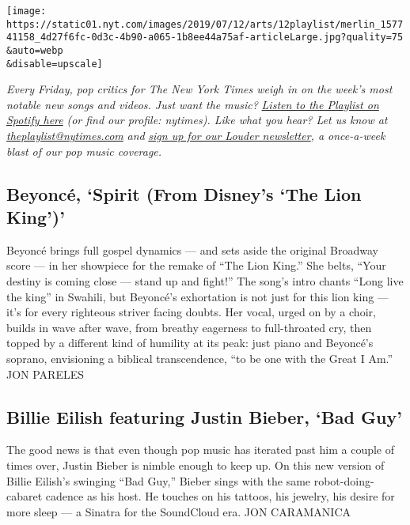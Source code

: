 \texttt{[image: https://static01.nyt.com/images/2019/07/12/arts/12playlist/merlin\_157741158\_4d27f6fc-0d3c-4b90-a065-1b8ee44a75af-articleLarge.jpg?quality=75\\\&auto=webp\\\&disable=upscale]}

\emph{Every Friday, pop critics for The New York Times weigh in on the
week's most notable new songs and videos. Just want the music?}
\href{https://open.spotify.com/playlist/35wPR33xiKIX0g8odMcWEX?si=ODVyHv3IRzapQ_5C4_eBNQ}{\emph{Listen
to the Playlist on Spotify here}} \emph{(or find our profile: nytimes).
Like what you hear? Let us know at}
\href{mailto:theplaylist@nytimes.com}{\emph{theplaylist@nytimes.com}}
\emph{and}
\href{https://www.nytimes.com/newsletters/louder?module=inline}{\emph{sign
up for our Louder newsletter}}\emph{, a once-a-week blast of our pop
music coverage.}

\hypertarget{beyoncuxe9-spirit-from-disneys-the-lion-king}{%
\subsection{Beyoncé, `Spirit (From Disney's `The Lion
King')'}\label{beyoncuxe9-spirit-from-disneys-the-lion-king}}

Beyoncé brings full gospel dynamics --- and sets aside the original
Broadway score --- in her showpiece for the remake of ``The Lion King.''
She belts, ``Your destiny is coming close --- stand up and fight!'' The
song's intro chants ``Long live the king'' in Swahili, but Beyoncé's
exhortation is not just for this lion king --- it's for every righteous
striver facing doubts. Her vocal, urged on by a choir, builds in wave
after wave, from breathy eagerness to full-throated cry, then topped by
a different kind of humility at its peak: just piano and Beyoncé's
soprano, envisioning a biblical transcendence, ``to be one with the
Great I Am.'' JON PARELES

\hypertarget{billie-eilish-featuring-justin-bieber-bad-guy}{%
\subsection{Billie Eilish featuring Justin Bieber, `Bad
Guy'}\label{billie-eilish-featuring-justin-bieber-bad-guy}}

The good news is that even though pop music has iterated past him a
couple of times over, Justin Bieber is nimble enough to keep up. On this
new version of Billie Eilish's swinging ``Bad Guy,'' Bieber sings with
the same robot-doing-cabaret cadence as his host. He touches on his
tattoos, his jewelry, his desire for more sleep --- a Sinatra for the
SoundCloud era. JON CARAMANICA

